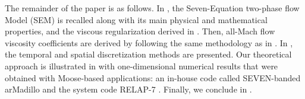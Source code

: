 \documentclass[preprint,10pt]{elsarticle}
\begin{document}

The remainder of the paper is as follows. In , the Seven-Equation two-phase flow Model (SEM) is recalled along with its main 
physical and mathematical properties, and the viscous regularization derived in \cite{Marco_paper_sem}. Then, all-Mach flow viscosity coefficients are derived by following the same methodology as in \cite{Marco_paper_low_mach}. In , the temporal and spatial discretization methods are presented. Our theoretical approach is illustrated in  with one-dimensional numerical results that were obtained with Moose-based applications: an in-house code called SEVEN-banded arMadillo and the system code RELAP-7 \cite{Berry_2014}.
Finally, we conclude in .
%
%
\end{document}
